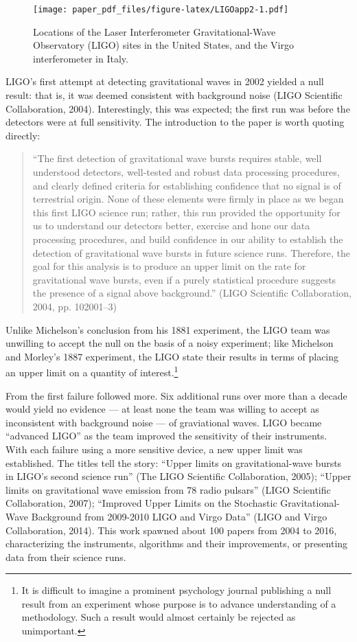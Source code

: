 \documentclass[english,floatsintext,man]{apa6}
\theoremstyle{definition}
\theoremstyle{definition}
\theoremstyle{definition}
\theoremstyle{remark}
\begin{document}
\begin{figure}
\centering
\texttt{[image: paper\_pdf\_files/figure-latex/LIGOapp2-1.pdf]}
\caption{\label{fig:LIGOapp2}Locations of the Laser Interferometer
Gravitational-Wave Observatory (LIGO) sites in the United States, and
the Virgo interferometer in Italy.}
\end{figure}

LIGO's first attempt at detecting gravitational waves in 2002 yielded a
null result: that is, it was deemed consistent with background noise
(LIGO Scientific Collaboration, 2004). Interestingly, this was expected;
the first run was before the detectors were at full sensitivity. The
introduction to the paper is worth quoting directly:

\begin{quote}
\enquote{The first detection of gravitational wave bursts requires
stable, well understood detectors, well-tested and robust data
processing procedures, and clearly defined criteria for establishing
confidence that no signal is of terrestrial origin. None of these
elements were firmly in place as we began this first LIGO science run;
rather, this run provided the opportunity for us to understand our
detectors better, exercise and hone our data processing procedures, and
build confidence in our ability to establish the detection of
gravitational wave bursts in future science runs. Therefore, the goal
for this analysis is to produce an upper limit on the rate for
gravitational wave bursts, even if a purely statistical procedure
suggests the presence of a signal above background.} (LIGO Scientific
Collaboration, 2004, pp. 102001--3)
\end{quote}

Unlike Michelson's conclusion from his 1881 experiment, the LIGO team
was unwilling to accept the null on the basis of a noisy experiment;
like Michelson and Morley's 1887 experiment, the LIGO state their
results in terms of placing an upper limit on a quantity of
interest.\footnote{It is difficult to imagine a prominent psychology
  journal publishing a null result from an experiment whose purpose is
  to advance understanding of a methodology. Such a result would almost
  certainly be rejected as unimportant.}

From the first failure followed more. Six additional runs over more than
a decade would yield no evidence --- at least none the team was willing
to accept as inconsistent with background noise --- of graviational
waves. LIGO became \enquote{advanced LIGO} as the team improved the
sensitivity of their instruments. With each failure using a more
sensitive device, a new upper limit was established. The titles tell the
story: \enquote{Upper limits on gravitational-wave bursts in LIGO's
second science run} (The LIGO Scientific Collaboration, 2005);
\enquote{Upper limits on gravitational wave emission from 78 radio
pulsars} (LIGO Scientific Collaboration, 2007); \enquote{Improved Upper
Limits on the Stochastic Gravitational-Wave Background from 2009-2010
LIGO and Virgo Data} (LIGO and Virgo Collaboration, 2014). This work
spawned about 100 papers from 2004 to 2016, characterizing the
instruments, algorithms and their improvements, or presenting data from
their science runs.
\end{document}
